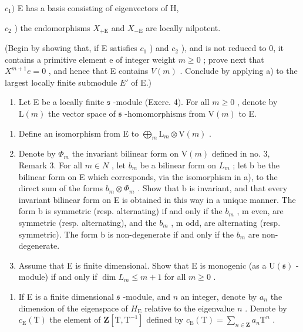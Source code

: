\(c_{1})\) E has a basis consisting of eigenvectors of H,

\(c_{2}\) ) the endomorphisms \(X_{+\mathrm{E}}\) and \(X_{-\mathrm{E}}\) are locally nilpotent.

(Begin by showing that, if E satisfies \(c_{1}\) ) and \(c_{2}\) ), and is not reduced to 0, it contains a primitive element e of integer weight \(m \geq 0\) ; prove next that \(X^{m+1}e = 0\) , and hence that E contains \(V(m)\) . Conclude by applying a) to the largest locally finite submodule \(E'\) of E.)

\begin{enumerate}
\def\labelenumi{\arabic{enumi})}
\setcounter{enumi}{4}
\tightlist
\item
  Let E be a locally finite \(\mathfrak{s}\) -module (Exerc. 4). For all \(m \geq 0\) , denote by \(\mathrm{L}(m)\) the vector space of \(\mathfrak{s}\) -homomorphisms from \(\mathrm{V}(m)\) to E.
\end{enumerate}

\begin{enumerate}
\def\labelenumi{\alph{enumi})}
\item
  Define an isomorphism from E to \(\bigoplus_{m} \mathrm{L}_{m} \otimes \mathrm{V}(m)\) .
\item
  Denote by \(\Phi_{m}\) the invariant bilinear form on \(\mathrm{V}(m)\) defined in no. 3, Remark 3. For all \(m \in N\) , let \(b_{m}\) be a bilinear form on \(L_{m}\) ; let b be the bilinear form on E which corresponds, via the isomorphism in a), to the direct sum of the forms \(b_{m} \otimes \Phi_{m}\) . Show that b is invariant, and that every invariant bilinear form on E is obtained in this way in a unique manner. The form b is symmetric (resp. alternating) if and only if the \(b_{m}\) , m even, are symmetric (resp. alternating), and the \(b_{m}\) , m odd, are alternating (resp. symmetric). The form b is non-degenerate if and only if the \(b_{m}\) are non-degenerate.
\item
  Assume that E is finite dimensional. Show that E is monogenic (as a \(\mathrm{U}(\mathfrak{s})\) -module) if and only if \(\dim L_{m} \leq m + 1\) for all \(m \geq 0\) .
\end{enumerate}

\begin{enumerate}
\def\labelenumi{\arabic{enumi})}
\setcounter{enumi}{5}
\tightlist
\item
  If E is a finite dimensional \(\mathfrak{s}\) -module, and \(n\) an integer, denote by \(a_{n}\) the dimension of the eigenspace of \(H_{\mathrm{E}}\) relative to the eigenvalue \(n\) . Denote by \(c_{\mathrm{E}}(\mathrm{T})\) the element of \(\mathbf{Z}[\mathrm{T},\mathrm{T}^{-1}]\) defined by \(c_{\mathrm{E}}(\mathrm{T}) = \sum_{n\in \mathbf{Z}}a_n\mathrm{T}^n\) .
\end{enumerate}


